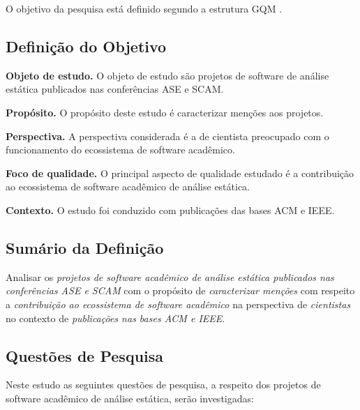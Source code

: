 O objetivo da pesquisa está definido segundo a estrutura GQM \cite{van1999goal}.

\subsection{Definição do Objetivo}

\begin{description}
\item{\bf Objeto de estudo.} 
O objeto de estudo são projetos de software de análise estática publicados nas conferências ASE e SCAM.

\item{\bf Propósito.} 
O propósito deste estudo é caracterizar menções aos projetos.

\item{\bf Perspectiva.} 
A perspectiva considerada é a de cientista preocupado com o funcionamento do ecossistema de software acadêmico.

\item{\bf Foco de qualidade.} 
O principal aspecto de qualidade estudado é a contribuição ao ecossistema de software acadêmico de análise estática.

\item{\bf Contexto.} 
O estudo foi conduzido com publicações das bases ACM e IEEE.
\end{description}

\subsection{Sumário da Definição}

Analisar os \textit{projetos de software acadêmico de análise estática publicados nas conferências ASE e SCAM}
com o propósito de \textit{caracterizar menções}
com respeito a \textit{contribuição ao ecossistema de software acadêmico}
na perspectiva de \textit{cientistas}
no contexto de \textit{publicações nas bases ACM e IEEE}.

\subsection{Questões de Pesquisa}

Neste estudo as seguintes questões de pesquisa, a respeito dos projetos de
software acadêmico de análise estática, serão investigadas:

\newcommand{\EstudoDoisQuestaoUm}{
  Como os projetos de software acadêmico de análise estática publicados nas
  conferências ASE e SCAM são mencionados em publicações nas bases ACM e IEEE?
}
\newcommand{\EstudoDoisQuestaoDois}{
   Os projetos de software acadêmico de análise estática publicados nas
   conferências ASE e SCAM são utilizados em publicações nas bases ACM e IEEE?
}
\newcommand{\EstudoDoisQuestaoTres}{
  Os projetos de software acadêmico de análise estática publicados nas
  conferências ASE e SCAM recebem contribuições de código fonte em publicações
  nas bases ACM e IEEE?
}

